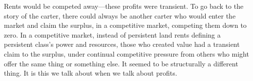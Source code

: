 Rents would be competed away---these profits were transient. To go back to the story of the carter, there could always be another carter who would enter the market and claim the surplus, in a competitive market, competing them down to zero. In a competitive market, instead of persistent land rents defining a persistent class's power and resources, those who created value had a transient claim to the surplus, under continual competitive pressure from others who might offer the same thing or something else. It seemed to be structurally a different thing. It is this we talk about when we talk about \glspl{profit}. 






